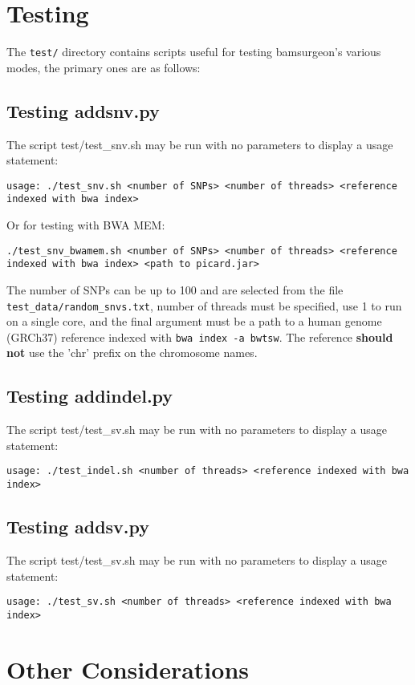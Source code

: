 \documentclass[letterpaper,11pt]{article}
\begin{document}
\section{Testing}
The \texttt{test/} directory contains scripts useful for testing bamsurgeon's various modes, the primary ones are as follows:
\subsection{Testing addsnv.py}
The script {test/test\_snv.sh} may be run with no parameters to display a usage statement:
\begin{verbatim}
usage: ./test_snv.sh <number of SNPs> <number of threads> <reference indexed with bwa index>
\end{verbatim}
Or for testing with BWA MEM:
\begin{verbatim}
./test_snv_bwamem.sh <number of SNPs> <number of threads> <reference indexed with bwa index> <path to picard.jar>
\end{verbatim}

The number of SNPs can be up to 100 and are selected from the file \texttt{test\_data/random\_snvs.txt}, number of threads must be specified, use 1 to run on a single core, and the final argument must be a path to a human genome (GRCh37) reference indexed with \texttt{bwa index -a bwtsw}. The reference \textbf{should not} use the 'chr' prefix on the chromosome names.

\subsection{Testing addindel.py}
The script {test/test\_sv.sh} may be run with no parameters to display a usage statement:
\begin{verbatim}
usage: ./test_indel.sh <number of threads> <reference indexed with bwa index>
\end{verbatim}

\subsection{Testing addsv.py}
The script {test/test\_sv.sh} may be run with no parameters to display a usage statement:
\begin{verbatim}
usage: ./test_sv.sh <number of threads> <reference indexed with bwa index>
\end{verbatim}



\section{Other Considerations}
\end{document}
